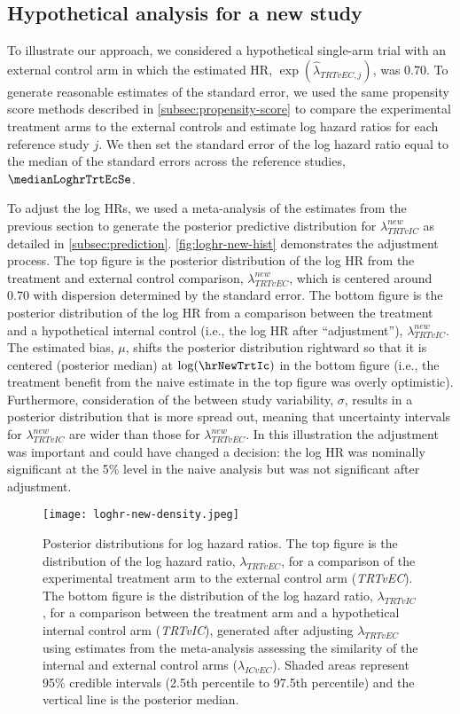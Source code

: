 \documentclass[11pt,final,fleqn]{article}\usepackage[]{graphicx}\usepackage[]{color}
\begin{document}
\subsection{Hypothetical analysis for a new study}
To illustrate our approach, we considered a hypothetical single-arm trial with an external control arm in which the estimated HR, $\exp(\hat{\lambda}_{\textit{TRT}vEC,j})$, was 0.70. To generate reasonable estimates of the standard error, we used the same propensity score methods described in \autoref{subsec:propensity-score} to compare the experimental treatment arms to the external controls and estimate log hazard ratios for each reference study $j$. We then set the standard error of the log hazard ratio equal to the median of the standard errors across the reference studies, $\medianLoghrTrtEcSe$.

To adjust the log HRs, we used a meta-analysis of the estimates from the previous section to generate the posterior predictive distribution for $\lambda^{new}_{\textit{TRT}vIC}$ as detailed in \autoref{subsec:prediction}. \autoref{fig:loghr-new-hist} demonstrates the adjustment process.\cite{gabry2019visualization} The top figure is the posterior distribution of the log HR from the treatment and external control comparison, $\lambda^{new}_{\textit{TRT}vEC}$, which is centered around $0.70$ with dispersion determined by the standard error. The bottom figure is the posterior distribution of the log HR from a comparison between the treatment and a hypothetical internal control (i.e., the log HR after ``adjustment''), $\lambda^{new}_{\textit{TRT}vIC}$. The estimated bias, $\mu$, shifts the posterior distribution rightward so that it is centered (posterior median) at $\log(\hrNewTrtIc)$ in the bottom figure (i.e., the treatment benefit from the naive estimate in the top figure was overly optimistic). Furthermore, consideration of the between study variability, $\sigma$, results in a posterior distribution that is more spread out, meaning that uncertainty intervals for $\lambda^{new}_{\textit{TRT}vIC}$ are wider than those for $\lambda^{new}_{\textit{TRT}vEC}$. In this illustration the adjustment was important and could have changed a decision: the log HR was nominally significant at the 5\% level in the naive analysis but was not significant after adjustment.

\begin{figure}[h]
\centering
\texttt{[image: loghr-new-density.jpeg]} 
\caption{Posterior distributions for log hazard ratios. The top figure is the distribution of the log hazard ratio, $\lambda_{\textit{TRT}vEC}$, for a comparison of the experimental treatment arm to the external control arm (\emph{TRTvEC}). The bottom figure is the distribution of the log hazard ratio, $\lambda_{\textit{TRT}vIC}$, for a comparison between the treatment arm and a hypothetical internal control arm (\emph{TRTvIC}), generated after adjusting $\lambda_{\textit{TRT}vEC}$ using estimates from the meta-analysis assessing the similarity of the internal and external control arms ($\lambda_{ICvEC}$). Shaded areas represent 95\% credible intervals (2.5th percentile to 97.5th percentile) and the vertical line is the posterior median.}
\label{fig:loghr-new-hist}
\end{figure}
\end{document}
